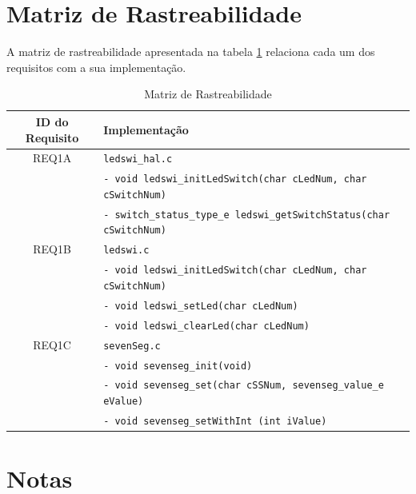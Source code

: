 \documentclass{article}
\begin{document}
\section{Matriz de Rastreabilidade}
A matriz de rastreabilidade apresentada na tabela \ref*{tab:rastreabilidade} relaciona cada um dos requisitos com a sua implementação.
\begin{table}[H]
	\centering
	\caption{Matriz de Rastreabilidade}
	\label{tab:rastreabilidade}
	\small
	\begin{tabular}{|c|l|}
		\hline \bfseries{ID do Requisito} & \bfseries{Implementação}\\ 
		\hline REQ1A 	& \texttt{ledswi\_hal.c}\\ 
						& \texttt{- void ledswi\_initLedSwitch(char cLedNum, char cSwitchNum)}\\
						& \texttt{- switch\_status\_type\_e ledswi\_getSwitchStatus(char cSwitchNum)}\\
		\hline REQ1B 	& \texttt{ledswi.c}\\ 
						& \texttt{- void ledswi\_initLedSwitch(char cLedNum, char cSwitchNum)}\\
						& \texttt{- void ledswi\_setLed(char cLedNum)}\\ 
						& \texttt{- void ledswi\_clearLed(char cLedNum)}\\
		\hline REQ1C 	& \texttt{sevenSeg.c}\\ 
						& \texttt{- void sevenseg\_init(void)}\\
						& \texttt{- void sevenseg\_set(char cSSNum, sevenseg\_value\_e eValue)}\\
						& \texttt{- void sevenseg\_setWithInt (int iValue)}\\
		\hline 
	\end{tabular} 
	\normalsize
\end{table}
\section{Notas}
\end{document}
